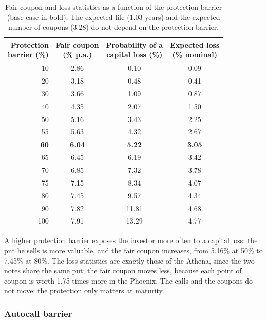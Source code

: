 \documentclass[11pt,a4paper]{article}
\begin{document}
\begin{table}[htbp]
  \centering
  \small
  \begin{tabular}{rccc}
    \toprule
    \makecell{Protection\\barrier (\%)} & \makecell{Fair coupon\\(\% p.a.)} &
    \makecell{Probability of a\\capital loss (\%)} & \makecell{Expected loss\\(\% nominal)} \\
    \midrule
     10 & 2.86 &  0.10 & 0.09 \\
     20 & 3.18 &  0.48 & 0.41 \\
     30 & 3.66 &  1.09 & 0.87 \\
     40 & 4.35 &  2.07 & 1.50 \\
     50 & 5.16 &  3.43 & 2.25 \\
     55 & 5.63 &  4.32 & 2.67 \\
     \textbf{60} & \textbf{6.04} & \textbf{5.22} & \textbf{3.05} \\
     65 & 6.45 &  6.19 & 3.42 \\
     70 & 6.85 &  7.32 & 3.78 \\
     75 & 7.15 &  8.34 & 4.07 \\
     80 & 7.45 &  9.57 & 4.34 \\
     90 & 7.82 & 11.81 & 4.68 \\
    100 & 7.91 & 13.29 & 4.77 \\
    \bottomrule
  \end{tabular}
  \caption{Fair coupon and loss statistics as a function of the protection barrier (base case in bold). The expected
           life (1.03 years) and the expected number of coupons (3.28) do not depend on the protection barrier.}
  \label{tab:phoenix-sensi-protection}
\end{table}

A higher protection barrier exposes the investor more often to a capital loss: the put he sells is more valuable, and
the fair coupon increases, from 5.16\% at 50\% to 7.45\% at 80\%. The loss statistics are exactly those of the Athena,
since the two notes share the same put; the fair coupon moves less, because each point of coupon is worth 1.75 times
more in the Phoenix. The calls and the coupons do not move: the protection only matters at maturity.

\clearpage
\subsubsection*{Autocall barrier}
\end{document}
